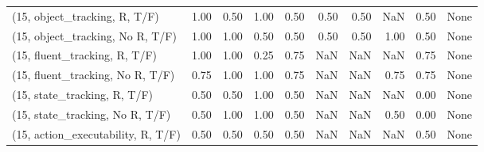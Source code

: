\begin{table*}[h!]
\begin{adjustbox}{width=2\columnwidth,center}
\begin{tabular}{lrrr|rrr|rrr}
\midrule
(15, object\_tracking, R, T/F)         &                      1.00 &                  0.50 &                      1.00 &                          0.50 &                      0.50 &                          0.50 &                                    NaN &                               0.50 &                                  None \\
(15, object\_tracking, No R, T/F)      &                      1.00 &                  1.00 &                      0.50 &                          0.50 &                      0.50 &                          0.50 &                                   1.00 &                               0.50 &                                  None \\
(15, fluent\_tracking, R, T/F)         &                      1.00 &                  1.00 &                      0.25 &                          0.75 &                       NaN &                           NaN &                                    NaN &                               0.75 &                                  None \\
(15, fluent\_tracking, No R, T/F)      &                      0.75 &                  1.00 &                      1.00 &                          0.75 &                       NaN &                           NaN &                                   0.75 &                               0.75 &                                  None \\
(15, state\_tracking, R, T/F)          &                      0.50 &                  0.50 &                      1.00 &                          0.50 &                       NaN &                           NaN &                                    NaN &                               0.00 &                                  None \\
(15, state\_tracking, No R, T/F)       &                      0.50 &                  1.00 &                      1.00 &                          0.50 &                       NaN &                           NaN &                                   0.50 &                               0.00 &                                  None \\
(15, action\_executability, R, T/F)    &                      0.50 &                  0.50 &                      0.50 &                          0.50 &                       NaN &                           NaN &                                    NaN &                               0.50 &                                  None \\

\end{tabular}
\end{adjustbox}
\end{table*}
